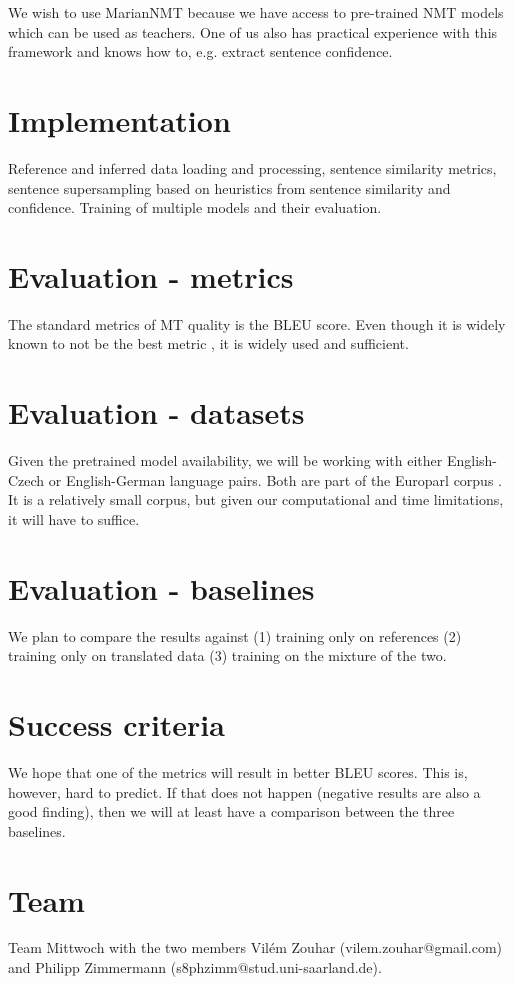 \documentclass[final]{cvpr}
\begin{document}
We wish to use MarianNMT \cite{mariannmt} because we have access to pre-trained NMT models which can be used as teachers. One of us also has practical experience with this framework and knows how to, e.g. extract sentence confidence.

\section{Implementation}

Reference and inferred data loading and processing, sentence similarity metrics, sentence supersampling based on heuristics from sentence similarity and confidence. Training of multiple models and their evaluation.

\section{Evaluation - metrics}

The standard metrics of MT quality is the BLEU score. Even though it is widely known to not be the best metric \cite{markables}, it is widely used and sufficient.

\section{Evaluation  -  datasets}

Given the pretrained model availability, we will be working with either English-Czech or English-German language pairs. Both are part of the Europarl corpus \cite{koehn2005europarl}. It is a relatively small corpus, but given our computational and time limitations, it will have to suffice.

\section{Evaluation - baselines}

We plan to compare the results against (1) training only on references (2) training only on translated data (3) training on the mixture of the two.

\section{Success criteria}

We hope that one of the metrics will result in better BLEU scores. This is, however, hard to predict. If that does not happen (negative results are also a good finding), then we will at least have a comparison between the three baselines.

\section{Team}

Team Mittwoch with the two members Vilém Zouhar (vilem.zouhar@gmail.com) and Philipp Zimmermann (s8phzimm@stud.uni-saarland.de).

{\small


}
\end{document}
